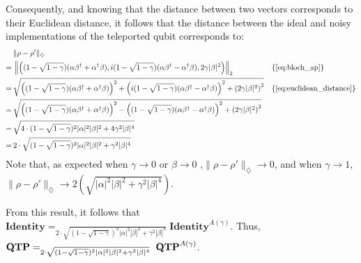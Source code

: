   Consequently, and knowing that the distance between two vectors corresponds to their Euclidean distance, it follows that the distance between the ideal and noisy implementations of the teleported qubit corresponds to:
\begin{equation}
  \begin{split}
  & \lVert \rho-\rho' \rVert_{\diamondsuit} \\
   = \hspace{2pt}&    \left\lVert  \left((1-\sqrt{1-\gamma}) (\alpha \beta^{\dag}  + \alpha^{\dag} \beta) ,i(1-\sqrt{1-\gamma}) (\alpha \beta^{\dag} - \alpha^{\dag} \beta),2\gamma |\beta|^{2}\right)  \right\rVert_{2} \hspace{50pt}  \{\text{\autoref{eq:bloch_ap}}\}  \\
   = \hspace{2pt}&  \sqrt{ \left( (1-\sqrt{1-\gamma}) (\alpha \beta^{\dag}  + \alpha^{\dag} \beta)\right)^{2} + \left(i(1-\sqrt{1-\gamma}) (\alpha \beta^{\dag} - \alpha^{\dag} \beta)\right)^{2} + \left(2\gamma |\beta|^{2}\right)^{2}} \hspace{10pt} \{\text{\autoref{eq:euclidean_distance}}\}\\
   = \hspace{2pt}&   \sqrt{  \left( (1-\sqrt{1-\gamma}) (\alpha \beta^{\dag}  + \alpha^{\dag} \beta)\right)^{2}  - \left((1-\sqrt{1-\gamma}) (\alpha \beta^{\dag} - \alpha^{\dag} \beta)\right)^{2} + \left(2\gamma |\beta|^{2}\right)^{2}} \\
   = \hspace{2pt}&  \sqrt{  4 \cdot  (1-\sqrt{1-\gamma})^{2} |\alpha|^{2}|\beta|^{2} + 4 \gamma^{2} |\beta|^{4}} \\
   = \hspace{2pt}&  2 \cdot \sqrt{  (1-\sqrt{1-\gamma})^{2} |\alpha|^{2}|\beta|^{2} + \gamma^{2} |\beta|^{4}} \\
\end{split}
\end{equation}
Note that, as expected when $\gamma \xrightarrow{}0$ or $\beta \xrightarrow{}0$ ,$\lVert \rho-\rho' \rVert_{\diamondsuit}\xrightarrow{}0$, and when $\gamma \xrightarrow{}1$, $\lVert \rho-\rho' \rVert_{\diamondsuit}\xrightarrow{} 2 \left(\sqrt{|\alpha|^{2}|\beta|^{2} + \gamma^{2} |\beta|^{4}}\right)$.

From this result, it follows that $\textbf{Identity} =_{ 2 \cdot \sqrt{  (1-\sqrt{1-\gamma})^{2} |\alpha|^{2}|\beta|^{2}+ \gamma^{2} |\beta|^{4}}} \textbf{Identity}^{A(\gamma)}$. Thus, $ \\ \textbf{QTP} =_{2 \cdot \sqrt{  (1-\sqrt{1-\gamma})^{2} |\alpha|^{2}|\beta|^{2} + \gamma^{2} |\beta|^{4}}} \hspace{3pt}\textbf{QTP}^{A(\gamma)}$.

